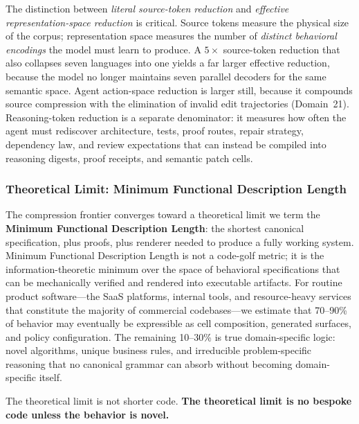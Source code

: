 The distinction between \emph{literal source-token reduction} and
\emph{effective representation-space reduction} is critical.  Source
tokens measure the physical size of the corpus; representation space
measures the number of \emph{distinct behavioral encodings} the model
must learn to produce.  A $5\times$ source-token reduction that also
collapses seven languages into one yields a far larger effective
reduction, because the model no longer maintains seven parallel
decoders for the same semantic space.  Agent action-space reduction is
larger still, because it compounds source compression with the
elimination of invalid edit trajectories (Domain~21).  Reasoning-token
reduction is a separate denominator: it measures how often the agent
must rediscover architecture, tests, proof routes, repair strategy,
dependency law, and review expectations that can instead be compiled
into reasoning digests, proof receipts, and semantic patch cells.


\subsubsection{Theoretical Limit: Minimum Functional Description Length}
\label{ssec:mfdl}

The compression frontier converges toward a theoretical limit we term
the \textbf{Minimum Functional Description Length}: the shortest
canonical specification, plus proofs, plus renderer needed to produce a
fully working system.  Minimum Functional Description Length is not a code-golf metric; it is the
information-theoretic minimum over the space of behavioral
specifications that can be mechanically verified and rendered into
executable artifacts.  For routine product software---the SaaS
platforms, internal tools, and resource-heavy services that constitute the
majority of commercial codebases---we estimate that 70--90\% of behavior
may eventually be expressible as cell composition, generated surfaces,
and policy configuration.  The remaining 10--30\% is true
domain-specific logic: novel algorithms, unique business rules, and
irreducible problem-specific reasoning that no canonical grammar can
absorb without becoming domain-specific itself.

The theoretical limit is not shorter code.  \textbf{The theoretical
limit is no bespoke code unless the behavior is novel.}
